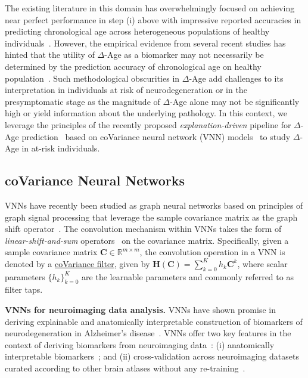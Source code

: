 \documentclass[conference]{IEEEtran}
\def\bC{{\mathbf{C}}}
\def\bH{{\mathbf{H}}}
\begin{document}
The existing literature in this domain has overwhelmingly focused on achieving near perfect performance in step (i) above with impressive reported accuracies in predicting chronological age across heterogeneous populations of healthy individuals~\cite{bashyam2020mri,peng2021accurate,niu2020improved}. However, the empirical evidence from several recent studies has hinted that the utility of $\Delta$-Age as a biomarker may not necessarily be determined by the prediction accuracy of chronological age on healthy population~\cite{bashyam2020mri,jirsaraie2023systematic,sihag2023explainable, schulz2025brain}. Such methodological obscurities in $\Delta$-Age add challenges to its interpretation in individuals at risk of neurodegeneration or in the presymptomatic stage as the magnitude of $\Delta$-Age alone may not be significantly high or yield information about the underlying pathology. In this context, we leverage the principles of the recently proposed \textit{explanation-driven} pipeline for $\Delta$-Age prediction~\cite{sihag2023explainable, sihag2025disentangling} based on coVariance neural network (VNN) models~\cite{sihag2022covariance} to study $\Delta$-Age in at-risk individuals.

\subsection{coVariance Neural Networks}
VNNs have recently been studied as graph neural networks based on principles of graph signal processing that leverage the sample covariance matrix as the graph shift operator~\cite{sihag2022covariance,cavallo2024fair,sihagJSTSP,sihag2023explainable}. The convolution mechanism within VNNs takes the form of \emph{linear-shift-and-sum} operators~\cite{ortega2018graph} on the covariance matrix. Specifically, given a sample covariance matrix ${\bC} \in \mathbb{R}^{m\times m}$, the convolution operation in a VNN is denoted by a \underline{coVariance filter}, given by $\bH(\bC) = \sum_{k=0}^K h_k \bC^k$, where scalar parameters $\{h_k\}_{k=0}^K$ are the learnable parameters and commonly referred to as filter taps.

\noindent
{\bf VNNs for neuroimaging data analysis.} VNNs have shown promise in deriving explainable and anatomically interpretable construction of biomarkers of neurodegeneration in Alzheimer's disease~\cite{sihag2023explainable, sihag2025disentangling,sihag2024towards,sihag2022predicting}. VNNs offer two key features in the context of deriving biomarkers from neuroimaging data~\cite{sihag2025disentangling}: (i) anatomically interpretable biomarkers~\cite{sihag2023explainable}; and (ii) cross-validation across neuroimaging datasets curated according to other brain atlases without any re-training~\cite{sihagJSTSP}.
\end{document}
